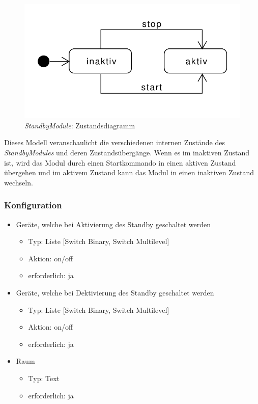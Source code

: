 \begin{figure}[h!]
	\centering
	\includegraphics[scale=0.7]{img/Modulkonzeption/StandbyStateMachine.pdf}
	\caption{\emph{StandbyModule}: Zustandsdiagramm}
	\label{fig:standbyStateMachine}
\end{figure}


Dieses Modell veranschaulicht die verschiedenen internen Zustände des \emph{StandbyModules} und deren Zustandsübergänge. Wenn es im inaktiven Zustand ist, wird das Modul durch einen Startkommando in einen aktiven Zustand übergehen und im aktivem Zustand kann das Modul in einen inaktiven Zustand wechseln.

\subsubsection{Konfiguration}
\begin{itemize}
	\item Geräte, welche bei Aktivierung des Standby geschaltet werden
	\begin{itemize}
		\item 	Typ: Liste [Switch Binary, Switch Multilevel]
		\item Aktion: on/off 
		\item erforderlich: ja
	\end{itemize}
	\item Geräte, welche bei Dektivierung des Standby geschaltet werden
	\begin{itemize}
		\item 	Typ: Liste [Switch Binary, Switch Multilevel]
		\item Aktion: on/off 
		\item erforderlich: ja
	\end{itemize}
	\item Raum
	\begin{itemize}
		\item Typ: Text
		\item erforderlich: ja
	\end{itemize}
\end{itemize}

